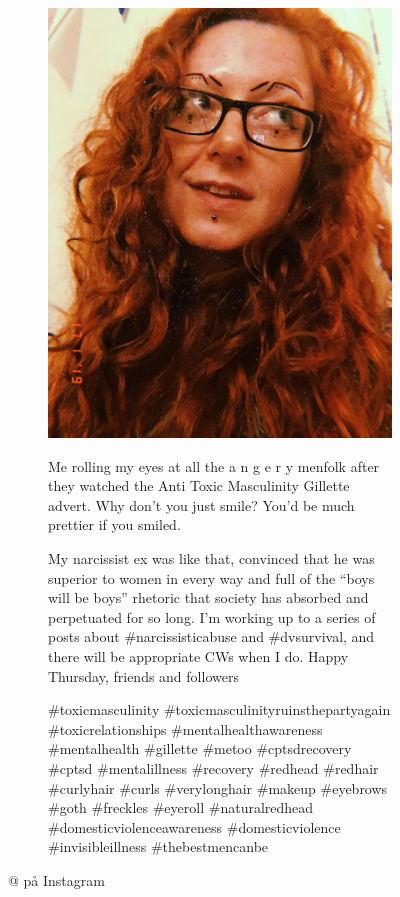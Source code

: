 \begin{figure}[H]
    \footnotesize
    \centering
    \begin{subfigure}[b]{0.48\linewidth}
        \includegraphics[width=\textwidth]{../data/cases/thebest/2019-01-17_22-24-27_UTC.jpg}
    \end{subfigure}
    \qquad
    \begin{subfigure}[b]{0.3\linewidth}

        Me rolling my eyes at all the a n g e r y menfolk after 
        they watched the Anti Toxic Masculinity Gillette advert.
        Why don’t you just smile? You’d be much prettier if you 
        smiled.

        My narcissist ex was like that, convinced that he was 
        superior to women in every way and full of the “boys will 
        be boys” rhetoric that society has absorbed and 
        perpetuated for so long. I’m working up to a series of 
        posts about \#narcissisticabuse and \#dvsurvival, and 
        there will be appropriate CWs when I do.  Happy Thursday, 
        friends and followers %

        \#toxicmasculinity \#toxicmasculinityruinsthepartyagain 
        \#toxicrelationships \#mentalhealthawareness 
        \#mentalhealth \#gillette \#metoo \#cptsdrecovery \#cptsd 
        \#mentalillness \#recovery \#redhead \#redhair \#curlyhair 
        \#curls \#verylonghair \#makeup \#eyebrows \#goth 
        \#freckles \#eyeroll \#naturalredhead 
        \#domesticviolenceawareness \#domesticviolence 
        \#invisibleillness \#thebestmencanbe
    \end{subfigure}
    \caption{@\citeauthor{rebelliousredhead2019} på Instagram}
    \label{img:thebest}
\end{figure}
